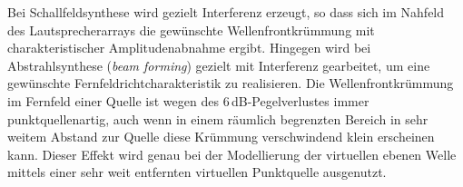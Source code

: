 Bei Schallfeldsynthese wird gezielt Interferenz erzeugt, so dass sich im Nahfeld des
Lautsprecherarrays die gewünschte Wellenfrontkrümmung mit charakteristischer
Amplitudenabnahme ergibt.
%
Hingegen wird bei Abstrahlsynthese (\textit{beam forming}) gezielt mit
Interferenz gearbeitet, um eine gewünschte Fernfeldrichtcharakteristik zu
realisieren.
%
Die Wellenfrontkrümmung im Fernfeld einer Quelle ist wegen des $6$\,dB-Pegelverlustes
immer punktquellenartig,
%
auch wenn in einem räumlich begrenzten Bereich in sehr weitem Abstand zur Quelle
diese Krümmung verschwindend klein erscheinen kann.
%
Dieser Effekt wird genau bei der Modellierung der virtuellen ebenen Welle mittels
einer sehr weit entfernten virtuellen Punktquelle ausgenutzt.







